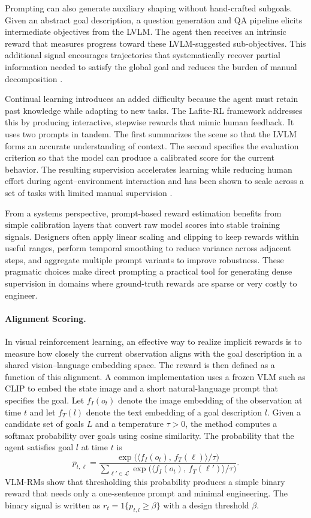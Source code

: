 \documentclass[master,english,final]{kaist-ucs}
\begin{document}
Prompting can also generate auxiliary shaping without hand-crafted subgoals. Given an abstract goal description, a question generation and QA pipeline elicits intermediate objectives from the LVLM. The agent then receives an intrinsic reward that measures progress toward these LVLM-suggested sub-objectives. This additional signal encourages trajectories that systematically recover partial information needed to satisfy the global goal and reduces the burden of manual decomposition \cite{carta2023grounding}.

Continual learning introduces an added difficulty because the agent must retain past knowledge while adapting to new tasks. The Lafite-RL framework\cite{chu2023accelerating} addresses this by producing interactive, stepwise rewards that mimic human feedback. It uses two prompts in tandem. The first summarizes the scene so that the LVLM forms an accurate understanding of context. The second specifies the evaluation criterion so that the model can produce a calibrated score for the current behavior. The resulting supervision accelerates learning while reducing human effort during agent–environment interaction and has been shown to scale across a set of tasks with limited manual supervision \cite{chu2023accelerating}.

From a systems perspective, prompt-based reward estimation benefits from simple calibration layers that convert raw model scores into stable training signals. Designers often apply linear scaling and clipping to keep rewards within useful ranges, perform temporal smoothing to reduce variance across adjacent steps, and aggregate multiple prompt variants to improve robustness. These pragmatic choices make direct prompting a practical tool for generating dense supervision in domains where ground-truth rewards are sparse or very costly to engineer.


\paragraph{Alignment Scoring. }
In visual reinforcement learning, an effective way to realize implicit rewards is to measure how closely the current observation aligns with the goal description in a shared vision–language embedding space. The reward is then defined as a function of this alignment. A common implementation uses a frozen VLM such as CLIP\cite{radford2021learning} to embed the state image and a short natural-language prompt that specifies the goal. Let $f_I(o_t)$ denote the image embedding of the observation at time $t$ and let $f_T(l)$ denote the text embedding of a goal description $l$. Given a candidate set of goals $L$ and a temperature $\tau > 0$, the method computes a softmax probability over goals using cosine similarity. The probability that the agent satisfies goal $l$ at time $t$ is 
$$p_{t,\ell}=
\frac{\exp\!\big(\langle f_I(o_t),\, f_T(\ell)\rangle / \tau\big)}
{\sum_{\ell' \in \mathcal{L}} \exp\!\big(\langle f_I(o_t),\, f_T(\ell')\rangle / \tau\big)}.$$
VLM-RMs\cite{rocamonde2023vision} show that thresholding this probability produces a simple binary reward that needs only a one-sentence prompt and minimal engineering. The binary signal is written as $r_t=1\{p_{t,l}\geq \beta\}$ with a design threshold $\beta$.
\end{document}
